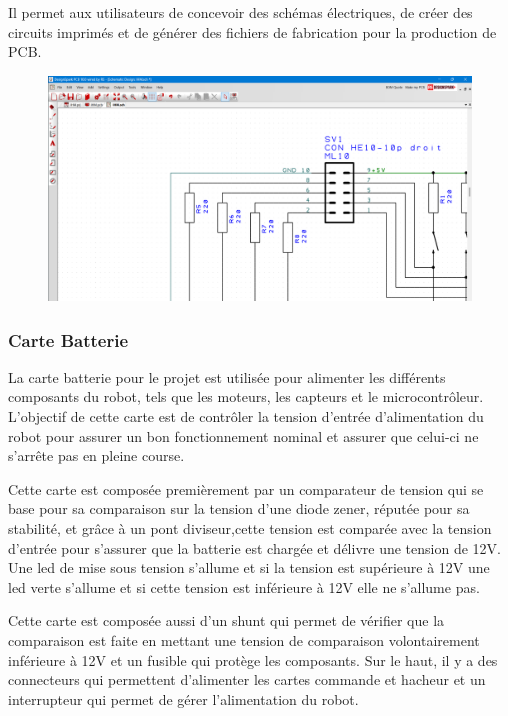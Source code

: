 Il permet aux utilisateurs de concevoir des schémas électriques, de créer des circuits imprimés et de générer des fichiers de fabrication pour la production de PCB.

\begin{figure}[H]
\centering
\begin{minipage}{.5\textwidth}
  \centering
  \centerline{\includegraphics[width=1.5\linewidth]{img/dspcb.png}}
  \label{fig:dspcb}
\end{minipage}%
\end{figure}

\subsubsection{Carte Batterie}

La carte batterie pour le projet est utilisée pour alimenter les différents composants du robot, tels que les moteurs, les capteurs et le microcontrôleur. 
L’objectif de cette carte est de contrôler la tension d’entrée d’alimentation du robot pour assurer un bon fonctionnement nominal et assurer que celui-ci ne s'arrête pas en pleine course.

Cette carte est composée premièrement par un comparateur de tension qui se base pour sa comparaison sur la tension d’une diode zener, réputée pour sa stabilité, et grâce à un pont diviseur,cette tension est comparée avec la tension d’entrée pour s'assurer que la batterie est chargée et délivre une tension de 12V. 
Une led de mise sous tension s’allume et si la tension est supérieure à 12V une led verte s’allume et si cette tension est inférieure à 12V elle ne s’allume pas.


Cette carte est composée aussi d’un shunt qui permet de vérifier que la comparaison est faite en mettant une tension de comparaison volontairement inférieure à 12V et un fusible qui protège les composants.
Sur le haut, il y a des connecteurs qui permettent d’alimenter les cartes commande et hacheur et un interrupteur qui permet de gérer l’alimentation du robot.

